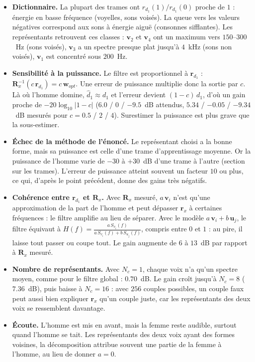 \begin{interpretation}
\begin{itemize}
  \item \textbf{Dictionnaire.} La plupart des trames ont $r_{d_1}(1)/r_{d_1}(0)$ proche de $1$ : énergie en basse fréquence (voyelles, sons voisés). La queue vers les valeurs négatives correspond aux sons à énergie aiguë (consonnes sifflantes). Les représentants retrouvent ces classes : $\mathbf{v}_2$ et $\mathbf{v}_4$ ont un maximum vers $150$--$300$~Hz (sons voisés), $\mathbf{v}_3$ a un spectre presque plat jusqu'à $4$~kHz (sons non voisés), $\mathbf{v}_1$ est concentré sous $200$~Hz.
  \item \textbf{Sensibilité à la puissance.} Le filtre est proportionnel à $\mathbf{r}_{d_1}$ : $\mathbf{R}_x^{-1}(c\,\mathbf{r}_{d_1})=c\,\mathbf{w}_{opt}$. Une erreur de puissance multiplie donc la sortie par $c$. Là où l'homme domine, $\hat d_1\approx d_1$ et l'erreur devient $(1-c)\,d_1$, d'où un gain proche de $-20\log_{10}|1-c|$ ($6.0$ / $0$ / $-9.5$~dB attendus, $5.34$ / $-0.05$ / $-9.34$~dB mesurés pour $c=0.5$ / $2$ / $4$). Surestimer la puissance est plus grave que la sous-estimer.
  \item \textbf{Échec de la méthode de l'énoncé.} Le représentant choisi a la bonne forme, mais sa puissance est celle d'une trame d'apprentissage moyenne. Or la puissance de l'homme varie de $-30$ à $+30$~dB d'une trame à l'autre (section sur les trames). L'erreur de puissance atteint souvent un facteur $10$ ou plus, ce qui, d'après le point précédent, donne des gains très négatifs.
  \item \textbf{Cohérence entre $\mathbf{r}_{d_1}$ et $\mathbf{R}_x$.} Avec $\mathbf{R}_x$ mesuré, $a\,\mathbf{v}_i$ n'est qu'une approximation de la part de l'homme et peut dépasser $\mathbf{r}_x$ à certaines fréquences : le filtre amplifie au lieu de séparer. Avec le modèle $a\,\mathbf{v}_i+b\,\mathbf{u}_j$, le filtre équivaut à $H(f)=\frac{a\,S_{v_i}(f)}{a\,S_{v_i}(f)+b\,S_{u_j}(f)}$, compris entre $0$ et $1$ : au pire, il laisse tout passer ou coupe tout. Le gain augmente de $6$ à $13$~dB par rapport à $\mathbf{R}_x$ mesuré.
  \item \textbf{Nombre de représentants.} Avec $N_c=1$, chaque voix n'a qu'un spectre moyen, comme pour le filtre global : $0.70$~dB. Le gain croît jusqu'à $N_c=8$ ($7.36$~dB), puis baisse à $N_c=16$ : avec $256$ couples possibles, un couple faux peut aussi bien expliquer $\mathbf{r}_x$ qu'un couple juste, car les représentants des deux voix se ressemblent davantage.
  \item \textbf{Écoute.} L'homme est mis en avant, mais la femme reste audible, surtout quand l'homme se tait. Les représentants des deux voix ayant des formes voisines, la décomposition attribue souvent une partie de la femme à l'homme, au lieu de donner $a=0$.
\end{itemize}
\end{interpretation}

